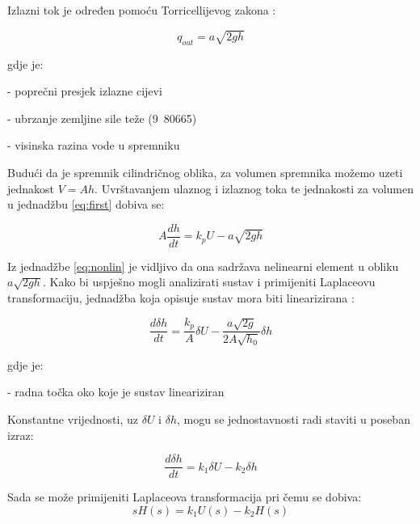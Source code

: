 Izlazni tok je određen pomoću Torricellijevog zakona \cite[75]{fluid}:

\begin{equation} q_{out} = a \sqrt{2gh} \end{equation}

gdje je:
\begin{description}[labelindent=2cm]
        \item[$a$] - poprečni presjek izlazne cijevi
        \item[$g$] - ubrzanje zemljine sile teže
            (\unit{9.80665}{\metre\per\square\second})
        \item[$h$] - visinska razina vode u spremniku
\end{description}

Budući da je spremnik cilindričnog oblika, za volumen spremnika možemo uzeti
jednakost $V = A h$. Uvrštavanjem ulaznog i izlaznog toka te jednakosti za
volumen u jednadžbu \ref{eq:first} dobiva se:

\begin{equation}
    A\frac{dh}{dt} = k_p U - a \sqrt{2gh}
\label{eq:nonlin}
\end{equation}

Iz jednadžbe \ref{eq:nonlin} je vidljivo da ona sadržava nelinearni element u obliku
$a \sqrt{2gh}$. Kako bi uspješno mogli analizirati sustav i primijeniti Laplaceovu
transformaciju, jednadžba koja opisuje sustav mora biti linearizirana
\cite[88-97]{control}:

\begin{equation} \frac{d\delta h}{dt} = \frac{k_p}{A} \delta U -
                 \frac{a \sqrt{2g}}{2 A \sqrt{h_0}} \delta h \end{equation}

gdje je:
\begin{description}[labelindent=2cm]
        \item[$h_0$] - radna točka oko koje je sustav lineariziran
\end{description}

Konstantne vrijednosti, uz $\delta U$ i $\delta h$, mogu se jednostavnosti radi
staviti u poseban izraz:

\begin{equation}
    \frac{d\delta h}{dt} = k_1 \delta U - k_2 \delta h
\end{equation}

Sada se može primijeniti Laplaceova transformacija \cite[35-44]{control} pri čemu
se dobiva:
\begin{equation} s H(s) = k_1 U(s) - k_2 H(s) \end{equation}

